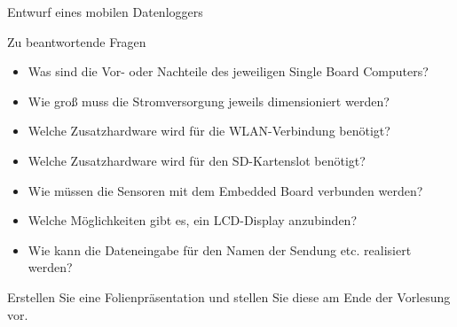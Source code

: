 {\begin{frame}[allowframebreaks]{Entwurf eines mobilen Datenloggers}
    \begin{block}{Zu beantwortende Fragen}
        \begin{itemize}
            \item Was sind die Vor- oder Nachteile des jeweiligen Single Board Computers?
            \item Wie groß muss die Stromversorgung jeweils dimensioniert werden?
            \item Welche Zusatzhardware wird für die WLAN-Verbindung benötigt?
            \item Welche Zusatzhardware wird für den SD-Kartenslot benötigt?
            \item Wie müssen die Sensoren mit dem Embedded Board verbunden werden?
            \item Welche Möglichkeiten gibt es, ein LCD-Display anzubinden?
            \item Wie kann die Dateneingabe für den Namen der Sendung etc. realisiert werden?
        \end{itemize}

        \bigskip
        Erstellen Sie eine Folienpräsentation und stellen Sie diese am Ende der Vorlesung vor.
    \end{block}
\end{frame}
}
